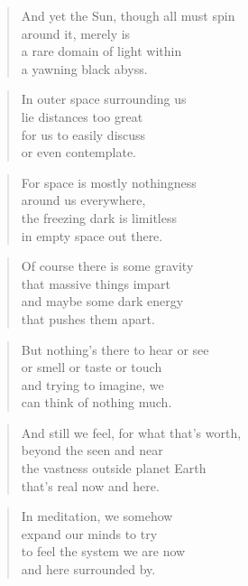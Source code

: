 \documentclass[10pt,a4paper]{article}
\begin{document}
\begin{paracol}{2}
\begin{verse}
And yet the Sun, though all must spin\\
around it, merely is\\
a rare domain of light within\\
a yawning black abyss.
\end{verse}

\begin{verse}
In outer space surrounding us\\
lie distances too great\\
for us to easily discuss\\
or even contemplate.
\end{verse}

\begin{verse}
For space is mostly nothingness\\
around us everywhere,\\
the freezing dark is limitless\\
in empty space out there.
\end{verse}

\begin{verse}
Of course there is some gravity\\
that massive things impart\\
and maybe some dark energy\\
that pushes them apart.
\end{verse}

\begin{verse}
But nothing’s there to hear or see\\
or smell or taste or touch\\
and trying to imagine, we\\
can think of nothing much.
\end{verse}

\begin{verse}
And still we feel, for what that’s worth,\\
beyond the seen and near\\
the vastness outside planet Earth\\
that’s real now and here.
\end{verse}

\begin{verse}
In meditation, we somehow\\
expand our minds to try\\
to feel the system we are now\\
and here surrounded by.
\end{verse}


\end{paracol}
\end{document}
